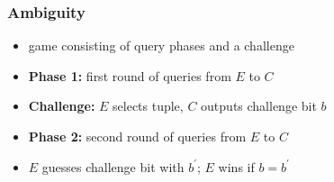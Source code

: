 \begin{frame}
	\frametitle{Ambiguity}

	\begin{itemize}[<+->]
		\setlength\itemsep{1em}
		\item game consisting of query phases and a challenge
		\item \textbf{Phase 1:} first round of queries from $E$ to $C$
		\item \textbf{Challenge:} $E$ selects tuple, $C$ outputs challenge bit $b$
		\item \textbf{Phase 2:} second round of queries from $E$ to $C$
		\item $E$ guesses challenge bit with $b^\prime$; $E$ wins if $b=b^\prime$ 
	\end{itemize}
\end{frame}